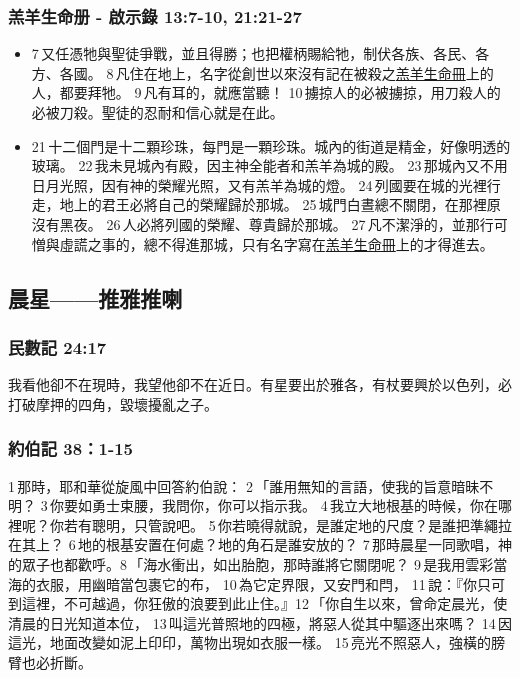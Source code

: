 \subsubsection{羔羊生命册 - 啟示錄 13:7-10, 21:21-27}
\begin{itemize} 
\itemsep-.25em
\item 7 又任憑牠與聖徒爭戰，並且得勝；也把權柄賜給牠，制伏各族、各民、各方、各國。 8 凡住在地上，名字從創世以來沒有記在被殺之\underline{羔羊生命冊}上的人，都要拜牠。 9 凡有耳的，就應當聽！ 10 擄掠人的必被擄掠，用刀殺人的必被刀殺。聖徒的忍耐和信心就是在此。
\item 21 十二個門是十二顆珍珠，每門是一顆珍珠。城內的街道是精金，好像明透的玻璃。 22 我未見城內有殿，因主神全能者和羔羊為城的殿。 23 那城內又不用日月光照，因有神的榮耀光照，又有羔羊為城的燈。 24 列國要在城的光裡行走，地上的君王必將自己的榮耀歸於那城。 25 城門白晝總不關閉，在那裡原沒有黑夜。 26 人必將列國的榮耀、尊貴歸於那城。 27 凡不潔淨的，並那行可憎與虛謊之事的，總不得進那城，只有名字寫在\underline{羔羊生命冊}上的才得進去。
\end{itemize} 





\subsection{晨星——推雅推喇}

\subsubsection{民數記 24:17}
我看他卻不在現時，我望他卻不在近日。有星要出於雅各，有杖要興於以色列，必打破摩押的四角，毀壞擾亂之子。

\subsubsection{約伯記 38：1-15}
1 那時，耶和華從旋風中回答約伯說： 2 「誰用無知的言語，使我的旨意暗昧不明？ 3 你要如勇士束腰，我問你，你可以指示我。 4 我立大地根基的時候，你在哪裡呢？你若有聰明，只管說吧。 5 你若曉得就說，是誰定地的尺度？是誰把準繩拉在其上？ 6 地的根基安置在何處？地的角石是誰安放的？ 7 那時晨星一同歌唱，神的眾子也都歡呼。8 「海水衝出，如出胎胞，那時誰將它關閉呢？ 9 是我用雲彩當海的衣服，用幽暗當包裹它的布， 10 為它定界限，又安門和閂， 11 說：『你只可到這裡，不可越過，你狂傲的浪要到此止住。』12 「你自生以來，曾命定晨光，使清晨的日光知道本位， 13 叫這光普照地的四極，將惡人從其中驅逐出來嗎？ 14 因這光，地面改變如泥上印印，萬物出現如衣服一樣。 15 亮光不照惡人，強橫的膀臂也必折斷。

